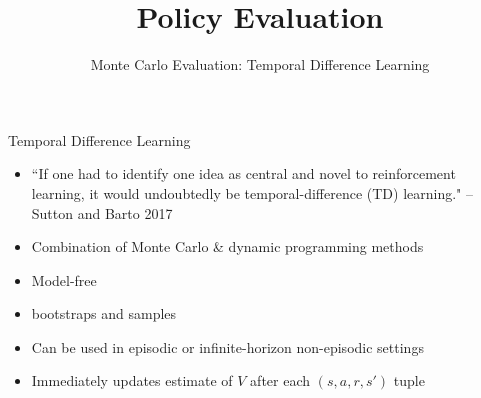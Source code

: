 \documentclass[aspectratio=169]{../latex_main/tntbeamer}  %
\title[Reinforcement Learning: Policy Evaluation]{Policy Evaluation}
\subtitle{Monte Carlo Evaluation: Temporal Difference Learning}
\begin{document}
	
	\maketitle


\begin{frame}[c]{Temporal Difference Learning}
	\begin{itemize}
		\item ``If one had to identify one idea as central and novel to reinforcement learning, it would undoubtedly be temporal-difference (TD) learning." -- Sutton and Barto 2017
		\item Combination of Monte Carlo \& dynamic programming methods
		\item Model-free
		\item \alert{bootstraps and samples}
		\item Can be used in episodic or infinite-horizon non-episodic settings
		\item Immediately updates estimate of $V$ after each $(s,a,r,s')$ tuple
	\end{itemize}
	
\end{frame}
\end{document}
